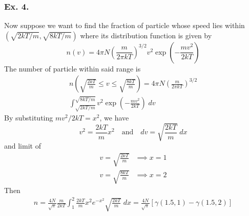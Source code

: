 \documentclass[../../main.tex]{subfiles}
\begin{document}
\subsubsection*{Ex. 4.} Now suppose we want to find the fraction of particle whose speed lies within $(\sqrt{2kT/m}, \sqrt{8kT/m})$ where its distribution function is given by 
\begin{equation*}
    n(v)=4\pi N\left(\frac{m}{2\pi kT}\right)^{3/2}v^2\exp\left(-\frac{mv^2}{2kT}\right)
\end{equation*}
The number of particle within said range is 
\begin{multline*}
    n\left(\sqrt{\frac{2kT}{m}}\leq v\leq \sqrt{\frac{8kT}{m}}\right)=4\pi N\left(\frac{m}{2\pi kT}\right)^{3/2}\\
    \int_{\sqrt{2kT/m}}^{\sqrt{8kT/m}}v^2\exp\left(-\frac{mv^2}{2kT}\right)\;dv
\end{multline*}
By substituting $mv^2/2kT=x^2$, we have 
\begin{equation*}
    v^2=\frac{2kT}{m}x^2\quad\text{and}\quad dv=\sqrt{\frac{2kT}{m}}\;dx
\end{equation*}
and limit of 
\begin{align*}
    v=\sqrt{\frac{2kT}{m}}&\implies x=1\\
    v=\sqrt{\frac{8kT}{m}}&\implies x=2
\end{align*}
Then 
\begin{align*}
    n=\frac{4N}{\sqrt{\pi}}\frac{m}{2kT}\int_{1}^{2}\frac{2kT}{m}x^2 e^{-x^2} \sqrt{\frac{ 2kT}{m }}\;dx=\frac{4N}{\sqrt{\pi}}\left[\gamma(1.5,1)-\gamma(1.5,2)\right]
\end{align*}
\end{document}
